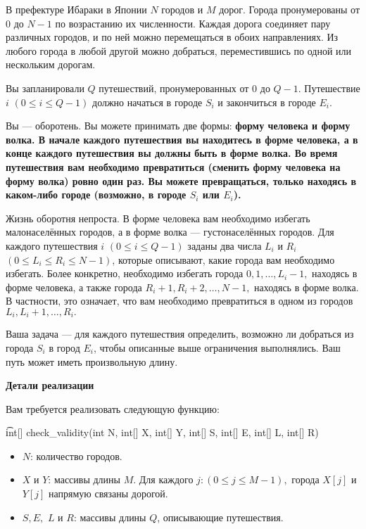В префектуре Ибараки в Японии $N$ городов и $M$ дорог. Города пронумерованы от $0$ до $N-1$ по возрастанию их численности. Каждая дорога соединяет пару различных городов, и по ней можно перемещаться в обоих направлениях. Из любого города в любой другой можно добраться, переместившись по одной или нескольким дорогам.

Вы запланировали $Q$ путешествий, пронумерованных от $0$ до $Q-1$. Путешествие $i$ $(0 \le i \le Q-1)$ должно начаться в городе $S_i$ и закончиться в городе $E_i$.

Вы --- оборотень. Вы можете принимать две формы: \bf{форму человека} и \bf{форму волка}. В начале каждого путешествия вы находитесь в форме человека, а в конце каждого путешествия вы должны быть в форме волка. Во время путешествия вам необходимо \bf{превратиться} (сменить форму человека на форму волка) ровно один раз. Вы можете превращаться, только находясь в каком-либо городе (возможно, в городе $S_i$ или $E_i$).

Жизнь оборотня непроста. В форме человека вам необходимо избегать малонаселённых городов, а в форме волка --- густонаселённых городов. Для каждого путешествия $i$ $(0 \le i \le Q-1)$ заданы два числа $L_i$ и $R_i$ $(0 \le L_i \le R_i \le N-1)$, которые описывают, какие города вам необходимо избегать. Более конкретно, необходимо избегать города $0, 1,  \dots , L_i-1,$ находясь в форме человека, а также города $R_i+1, R_i+2, \dots ,N-1,$ находясь в форме волка. В частности, это означает, что вам необходимо превратиться в одном из городов $L_i, L_i+1, \dots , R_i.$

Ваша задача --- для каждого путешествия определить, возможно ли добраться из города $S_i$ в город $E_i$, чтобы описанные выше ограничения выполнялись. Ваш путь может иметь произвольную длину.

\bf{Детали реализации}

Вам требуется реализовать следующую функцию:

\t{int[] check_validity(int N, int[] X, int[] Y, int[] S, int[] E, int[] L, int[] R)}

\begin{itemize}
\item $N$: количество городов. 
\item $X$ и $Y$: массивы длины $M$. Для каждого $j: (0 \le j \le M-1),$ города $X[j]$ и $Y[j]$ напрямую связаны дорогой. 
\item $S, E,$ $L$ и $R$: массивы длины $Q$, описывающие путешествия.
\end{itemize}

